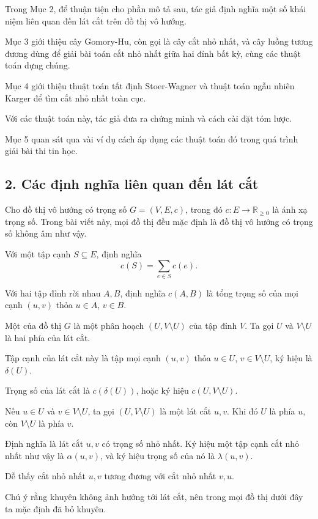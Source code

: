 \documentclass[11pt]{article}
\begin{document}
Trong Mục 2, để thuận tiện cho phần mô tả sau, tác giả định nghĩa một số khái
niệm liên quan đến lát cắt trên đồ thị vô hướng.

Mục 3 giới thiệu cây Gomory-Hu, còn gọi là cây cắt nhỏ nhất, và cây luồng
tương đương dùng để giải bài toán cắt nhỏ nhất giữa hai đỉnh bất kỳ, cùng các
thuật toán dựng chúng.

Mục 4 giới thiệu thuật toán tất định Stoer-Wagner và thuật toán ngẫu nhiên
Karger để tìm cắt nhỏ nhất toàn cục.

Với các thuật toán này, tác giả đưa ra chứng minh và cách cài đặt tóm lược.

Mục 5 quan sát qua vài ví dụ cách áp dụng các thuật toán đó trong quá trình
giải bài thi tin học.

\subsection*{2. Các định nghĩa liên quan đến lát cắt}

Cho đồ thị vô hướng có trọng số \(G=(V,E,c)\), trong đó
\(c:E\to\mathbb{R}_{\ge 0}\) là ánh xạ trọng số. Trong bài viết này, mọi đồ
thị đều mặc định là đồ thị vô hướng có trọng số không âm như vậy.

Với một tập cạnh \(S\subseteq E\), định nghĩa
\[
  c(S)=\sum_{e\in S}c(e).
\]

Với hai tập đỉnh rời nhau \(A,B\), định nghĩa \(c(A,B)\) là tổng trọng số của
mọi cạnh \((u,v)\) thỏa \(u\in A\), \(v\in B\).

Một  của đồ thị \(G\) là một phân hoạch \((U,V\setminus U)\) của
tập đỉnh \(V\). Ta gọi \(U\) và \(V\setminus U\) là hai phía của lát cắt.

Tập cạnh của lát cắt này là tập mọi cạnh \((u,v)\) thỏa
\(u\in U\), \(v\in V\setminus U\), ký hiệu là \(\delta(U)\).

Trọng số của lát cắt là \(c(\delta(U))\), hoặc ký hiệu \(c(U,V\setminus U)\).

Nếu \(u\in U\) và \(v\in V\setminus U\), ta gọi \((U,V\setminus U)\) là một
lát cắt \(u,v\). Khi đó \(U\) là phía \(u\), còn \(V\setminus U\) là phía
\(v\).

Định nghĩa  là lát cắt \(u,v\) có trọng số nhỏ
nhất. Ký hiệu một tập cạnh cắt nhỏ nhất như vậy là \(\alpha(u,v)\), và ký hiệu
trọng số của nó là \(\lambda(u,v)\).

Dễ thấy cắt nhỏ nhất \(u,v\) tương đương với cắt nhỏ nhất \(v,u\).

Chú ý rằng khuyên không ảnh hưởng tới lát cắt, nên trong mọi đồ thị dưới đây
ta mặc định đã bỏ khuyên.
\end{document}
